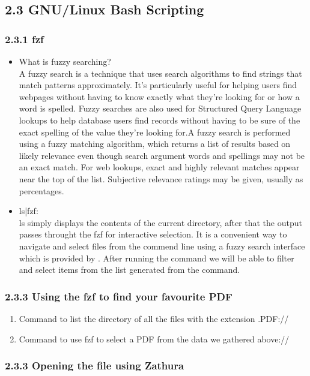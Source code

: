 \documentclass{article}
\begin{document}
\subsection*{\Large 2.3 GNU/Linux Bash Scripting}
\subsubsection*{\large 2.3.1 fzf}
\begin{itemize}
    \item What is fuzzy searching?\\
    A fuzzy search is a technique that uses search algorithms to find strings that match patterns approximately. It's particularly useful for helping users find webpages without having to know exactly what they're looking for or how a word is spelled. Fuzzy searches are also used for Structured Query Language lookups to help database users find records without having to be sure of the exact spelling of the value they're looking for.A fuzzy search is performed using a fuzzy matching algorithm, which returns a list of results based on likely relevance even though search argument words and spellings may not be an exact match. For web lookups, exact and highly relevant matches appear near the top of the list. Subjective relevance ratings may be given, usually as percentages.
    \item ls|fzf:\\
    ls simply displays the contents of the current directory, after that the output passes throught the 
    fzf  for interactive selection. It is a convenient way to navigate and select files from the commend line
    using a fuzzy search interface which is provided by . After running the command we will be able to filter 
    and select items from the list generated from the  command.
\end{itemize}
\subsubsection*{\large 2.3.3 Using the fzf to find your favourite PDF}
\begin{enumerate}
    \item Command to list the directory of all the files with the extension .PDF://
    \item Command to use fzf to select a PDF from the data we gathered above://
\end{enumerate}

\subsubsection*{\large 2.3.3 Opening the file using Zathura}
\end{document}
